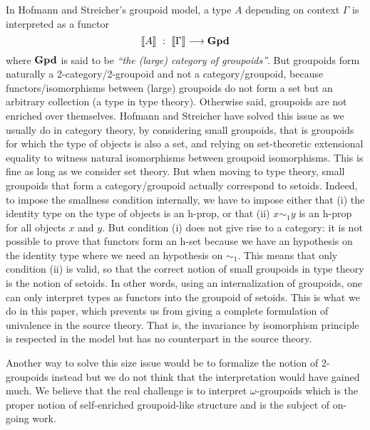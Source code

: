 In Hofmann and Streicher's groupoid model, a type $A$ depending on
context $\Gamma$ is interpreted as a functor 
$$
\sem{A} \ : \ \sem{\Gamma} \longrightarrow \GPD
$$
%
where $\mathbf{Gpd}$ is said to be \emph{``the (large) category of groupoids''}. 
%
But groupoids form naturally a 2-category/2-groupoid and not a
category/groupoid, because functors/isomorphisms between (large)
groupoids do not form a set but an arbitrary collection (a type in type
theory). Otherwise said, groupoids are not enriched over themselves.
%
Hofmann and Streicher have solved this issue as we usually do in
category theory, by considering small groupoids, that is groupoids for
which the type of objects is also a set, and relying on set-theoretic
extensional equality to witness natural isomorphisms between groupoid 
isomorphisms. This is fine as long as we consider set theory.
%
But when moving to type theory, small groupoids that form a
category/groupoid actually correspond to setoids. Indeed, to impose the
smallness condition internally, we have to impose either that (i)
the identity type on the type of objects is an h-prop, or that (ii) $x
\sim_1 y$ is an h-prop for all objects $x$ and $y$. But
condition (i) does not give rise to a category: it is not possible to prove that
functors form an h-set because we have an hypothesis on the identity type
where we need an hypothesis on $\sim_1$. 
%
This means that only condition (ii) is valid, so that the
correct notion of small groupoids in type theory is the notion of
setoids.
%
In other words, using an internalization of groupoids, one can only
interpret types as functors into the groupoid of setoids. This is what we do
in this paper, which prevents us from giving a complete formulation of
univalence in the source theory. That is, the invariance by
isomorphism principle is respected in the model but has no counterpart
in the source theory. 

Another way to solve this size issue would be to formalize the notion of
2-groupoids instead but we do not think that the interpretation would
have gained much. We believe that the real challenge is to interpret
$\omega$-groupoids which is the proper notion of self-enriched 
groupoid-like structure and is the subject of on-going work.


